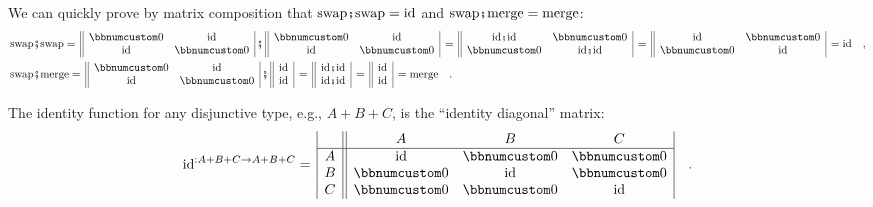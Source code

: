 We can quickly prove by matrix composition that $\text{swap}\bef\text{swap}=\text{id}$
and $\text{swap}\bef\text{merge}=\text{merge}$:\vspace{0\baselineskip}
\begin{align*}
 & \text{swap}\bef\text{swap}=\,\begin{array}{||cc|}
\bbnum 0 & \text{id}\\
\text{id} & \bbnum 0
\end{array}\,\bef\,\begin{array}{||cc|}
\bbnum 0 & \text{id}\\
\text{id} & \bbnum 0
\end{array}\,=\,\begin{array}{||cc|}
\text{id}\bef\text{id} & \bbnum 0\\
\bbnum 0 & \text{id}\bef\text{id}
\end{array}\,=\,\begin{array}{||cc|}
\text{id} & \bbnum 0\\
\bbnum 0 & \text{id}
\end{array}\,=\text{id}\quad,\\
 & \text{swap}\bef\text{merge}=\,\begin{array}{||cc|}
\bbnum 0 & \text{id}\\
\text{id} & \bbnum 0
\end{array}\,\bef\,\begin{array}{||c|}
\text{id}\\
\text{id}
\end{array}\,=\,\begin{array}{||c|}
\text{id}\bef\text{id}\\
\text{id}\bef\text{id}
\end{array}\,=\,\begin{array}{||c|}
\text{id}\\
\text{id}
\end{array}\,=\text{merge}\quad.
\end{align*}

The identity function for any disjunctive type, e.g., $A+B+C$, is
the \textsf{``}identity diagonal\textsf{''} matrix:
\[
\text{id}^{:A+B+C\rightarrow A+B+C}=\,\begin{array}{|c||ccc|}
 & A & B & C\\
\hline A & \text{id} & \bbnum 0 & \bbnum 0\\
B & \bbnum 0 & \text{id} & \bbnum 0\\
C & \bbnum 0 & \bbnum 0 & \text{id}
\end{array}\quad.
\]

